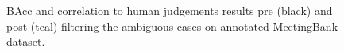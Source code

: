 \begin{figure}
\begin{minipage}{0.23\textwidth}
\end{minipage}\hfill

\caption{BAcc and correlation to human judgements results pre (black) and post (teal) filtering the ambiguous cases on annotated MeetingBank dataset.}
  \label{plot:ambiguity-filtering}
\end{figure}
